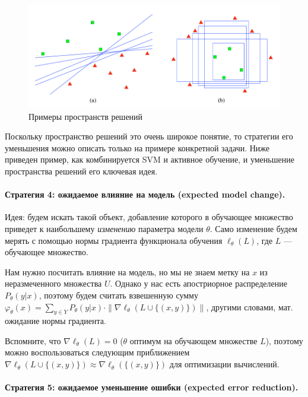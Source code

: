 \documentclass[specialist, 12pt, href]{article}
\begin{document}
\begin{figure}[htbp]
\centering
\includegraphics[width=6in]{img/vs.png}
\caption{Примеры пространств решений}
\end{figure}

Поскольку пространство решений это очень широкое понятие, то стратегии
его уменьшения можно описать только на примере конкретной задачи. Ниже
приведен пример, как комбинируется SVM и активное обучение, и уменьшение
пространства решений его ключевая идея.

\paragraph{Стратегия 4: ожидаемое влияние на модель (expected model
change).}

Идея: будем искать такой объект, добавление которого в обучающее
множество приведет к наибольшему \emph{изменению} параметра модели
\(\theta\). Само изменение будем мерять с помощью нормы градиента
функционала обучения \(\ell_{\theta}(L)\), где \(L\) --- обучающее
множество.

Нам нужно посчитать влияние на модель, но мы не знаем метку на \(x\) из
неразмеченного множества \(U\). Однако у нас есть апостриорное
распределение \(P_{\theta}(y|x)\), поэтому будем считать взвешенную
сумму
\(\varphi_{\theta}(x) = \sum_{y \in Y} P_{\theta}(y|x) \cdot \| \nabla\ell_{\theta}(L \cup \{(x, y)\})\|\),
другими словами, мат. ожидание нормы градиента.

Вспомните, что \(\nabla\ell_{\theta}(L) = 0\) (\(\theta\) оптимум на
обучающем множестве \(L\)), поэтому можно воспользоваться следующим
приближением
\(\nabla\ell_{\theta}(L \cup \{(x, y)\}) \approx \nabla\ell_{\theta}(\{(x, y)\})\)
для оптимизации вычислений.

\paragraph{Стратегия 5: ожидаемое уменьшение ошибки (expected error
reduction).}
\end{document}
